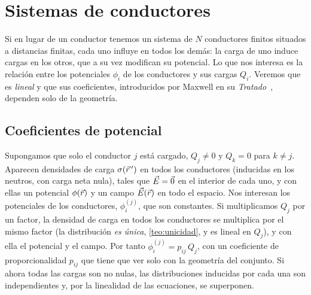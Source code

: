 \section{Sistemas de conductores}\label{sec:sistemas}
Si en lugar de un conductor tenemos un sistema de $N$ conductores finitos situados a distancias finitas, cada uno influye en todos los demás: la
carga de uno induce cargas en los otros, que a su vez modifican su potencial. Lo que nos interesa es la relación entre los potenciales
$\phi_i$ de los conductores y sus cargas $Q_i$. Veremos que es \emph{lineal} y que sus coeficientes, introducidos por Maxwell en su
\emph{Tratado}~\cite{MAXWELL}, dependen solo de la geometría.



\subsection{Coeficientes de potencial}\label{sec:pij}
 Supongamos que solo el conductor $j$ está cargado, $Q_j\neq0$ y $Q_k=0$ para $k\neq j$. Aparecen densidades de carga
$\sigma(\vec{r}\,')$ en todos los conductores (inducidas en los neutros, con carga neta nula), tales que $\vec{E}=\vec{0}$ en el interior de cada uno, y con ellas un
potencial $\phi(\vec{r})$ y un campo $\vec{E}(\vec{r})$ en todo el espacio. Nos interesan los potenciales de los conductores, $\phi_i^{(j)}$, que son constantes.
Si multiplicamos $Q_j$ por un factor, la densidad de carga en todos los conductores se multiplica por el mismo factor (la distribución \emph{es
única}, \cref{teo:unicidad}, y es lineal en $Q_j$), y con ella el potencial y el campo. Por tanto $\phi_i^{(j)}=p_{ij}\,Q_j$, con un coeficiente de
proporcionalidad $p_{ij}$ que tiene que ver solo con la geometría del conjunto. Si ahora todas las cargas son no nulas, las distribuciones
inducidas por cada una son independientes y, por la linealidad de las ecuaciones, se superponen.

